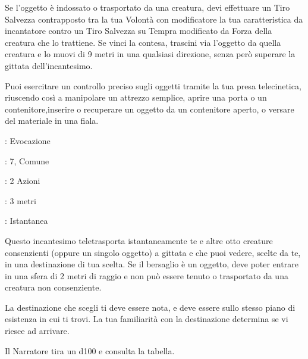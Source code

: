 \begin{multicols}{2}
Se l'oggetto è indossato o trasportato da una creatura, devi effettuare un Tiro Salvezza contrapposto tra la tua Volontà con modificatore la tua caratteristica da incantatore contro un Tiro Salvezza su Tempra modificato da Forza della creatura che lo trattiene. Se vinci la contesa, trascini via l'oggetto da quella creatura e lo muovi di 9 metri in una qualsiasi direzione, senza però superare la gittata dell'incantesimo.

Puoi esercitare un controllo preciso sugli oggetti tramite la tua presa telecinetica, riuscendo così a manipolare un attrezzo semplice, aprire una porta o un contenitore,inserire o recuperare un oggetto da un contenitore aperto, o versare del materiale in una fiala.

\noindent\colorbox{OBSSgold!10}{
\begin{minipage}{0.95\linewidth}
\begin{description}[noitemsep, topsep=0pt, parsep=0pt, partopsep=0pt, leftmargin=0cm, labelwidth=1.3cm]
	\item[\textbf{Lista}]: Evocazione
	\item[\textbf{Livello}]: 7, Comune
	\item[\textbf{Lancio}]: 2 Azioni
	\item[\textbf{Gittata}]: 3 metri
	\item[\textbf{Durata}]: Istantanea
\end{description}
\end{minipage}}\smallskip

Questo incantesimo teletrasporta istantaneamente te e altre otto creature consenzienti (oppure un singolo oggetto) a gittata e che puoi vedere, scelte da te, in una destinazione di tua scelta. Se il bersaglio è un oggetto, deve poter entrare in una sfera di 2 metri di raggio e non può essere tenuto o trasportato da una creatura non consenziente.

La destinazione che scegli ti deve essere nota, e deve essere sullo stesso piano di esistenza in cui ti trovi. La tua familiarità con la destinazione determina se vi riesce ad arrivare.

Il Narratore tira un d100 e consulta la tabella.


\end{multicols}
